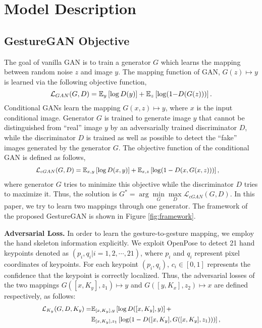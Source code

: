 \documentclass[sigconf]{acmart}
\begin{document}
\section{Model Description}
\label{sec:method}

\subsection{GestureGAN Objective}

The goal of vanilla GAN is to train a generator $G$ which learns the mapping between random noise $z$ and image $y$.
The mapping function of GAN, $G(z)\mapsto y$ is learned via the following objective function,
\begin{equation}\small
\mathcal{L}_{GAN}(G, D) = 
\mathbb{E}_y \left[ \log D(y) \right] +
\mathbb{E}_{z} \left[\log (1{-} D(G(z))) \right].
\end{equation}
Conditional GANs learn the mapping $G(x, z)\mapsto y$, where  $x$ is the input conditional image.
Generator $G$ is trained to generate image $\widehat{y}$ that cannot be distinguished from ``real'' image $y$ by an adversarially trained discriminator $D$, while the discriminator $D$ is trained as well as possible to detect the ``fake'' images generated by the generator $G$.  
The objective function of the conditional GAN is defined as follows,
\begin{equation}\small
\begin{aligned}
& \mathcal{L}_{cGAN}(G, D) = 
\mathbb{E}_{x, y} \left[ \log D(x, y) \right] + 
\mathbb{E}_{x, z} \left[\log (1 - D(x, G(x, z))) \right],
\end{aligned}
\label{eqn:conditonalgan}
\end{equation}
where generator $G$ tries to minimize this objective while the discriminator $D$ tries to maximize it. 
Thus, the solution is $G^*=\arg \min\limits_G \max\limits_D \mathcal{L}_{cGAN}(G, D).$
In this paper, we try to learn two mappings through one generator.
The framework of the proposed GestureGAN is shown in Figure \ref{fig:framework}.

\noindent \textbf{Adversarial Loss.} In order to learn the  gesture-to-gesture mapping, we employ the hand skeleton information explicitly.
We exploit OpenPose \cite{simon2017hand} to detect 21 hand keypoints denoted as $(p_i, q_i \vert i=1,2,\cdots,21)$, where $p_i$ and $q_i$ represent pixel coordinates of keypoints.
For each keypoint $(p_i, q_i)$, $c_i {\in} [0,1]$ represents the confidence that the keypoint is correctly localized.
Thus, the adversarial losses of the two mappings $G([x, K_y], z_1)\mapsto y$  and $G([y, K_x], z_2)\mapsto x$ are defined respectively, as follows:
\begin{equation}\small
\begin{aligned}
\mathcal{L}_{K_y}(G, D, K_y) = &  \mathbb{E}_{[x, K_y], y} \left[\log D([x, K_y], y) \right] +  \\
& \mathbb{E}_{[x,K_y], z_1} \left[\log (1 - D([x, K_y], G([x, K_y], z_1))) \right],
\end{aligned}
\label{eqn:keypointgan}
\end{equation}
\end{document}
